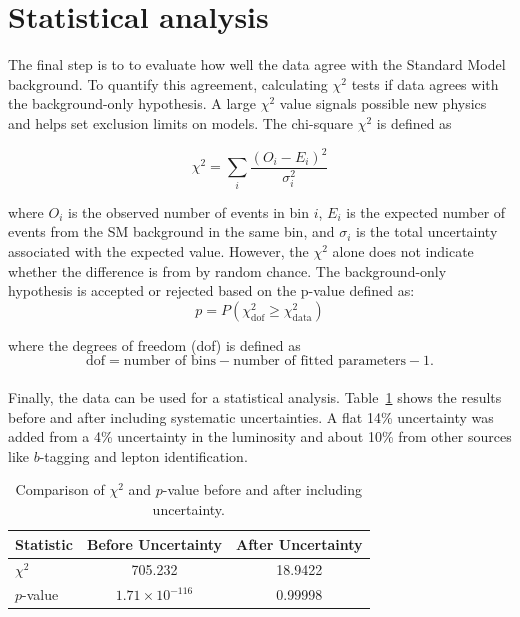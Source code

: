     \section{Statistical analysis}
    The final step is to to evaluate how well the data agree with the Standard Model background. To quantify this agreement, calculating \(\chi^2\) tests if data agrees with the background-only hypothesis. A large \(\chi^2\) value signals possible new physics and helps set exclusion limits on models. The chi-square \(\chi^2\) is defined as

    \begin{equation}
         \chi^2 = \sum_i \frac{(O_i - E_i)^2}{\sigma_i^2}
    \label{eq:chi_square}
    \end{equation}

    where \(O_i\) is the observed number of events in bin \(i\), \(E_i\) is the expected number of events from the SM background in the same bin, and \(\sigma_i\) is the total uncertainty associated with the expected value. However, the \(\chi^2\) alone does not indicate whether the difference is from by random chance. The background-only hypothesis is accepted or rejected based on the p-value defined as:
    \[
    p = P\left(\chi^2_{\text{dof}} \geq \chi^2_{\text{data}}\right)
    \]

    where the degrees of freedom (dof) is defined as
    \[
    \text{dof} = \text{number of bins} - \text{number of fitted parameters} - 1.
    \]
   \\
    Finally, the data can be used for a statistical analysis. Table~\ref{tab:chi2_comparison} shows the results before and after including systematic uncertainties. A flat 14\% uncertainty was added from a 4\% uncertainty in the luminosity and about 10\% from other sources like $b$-tagging and lepton identification.
    \\

\begin{table}[H]
    \centering
    \begin{tabular}{lcc}
        \hline
        \textbf{Statistic} & \textbf{Before Uncertainty} & \textbf{After Uncertainty} \\
        \hline
        \(\chi^2\) & 705.232 & 18.9422 \\
        \(p\)-value & \(1.71 \times 10^{-116}\) & 0.99998 \\
        \hline
    \end{tabular}
    \caption{Comparison of \(\chi^2\) and \(p\)-value before and after including uncertainty.}
    \label{tab:chi2_comparison}
\end{table}

